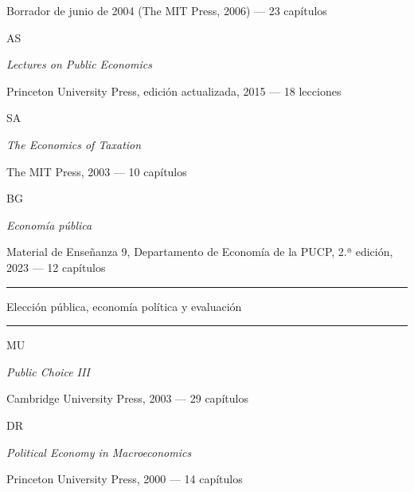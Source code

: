 \documentclass[11pt,a4paper]{article}
\newcommand{\etiqueta}[2]{%
  {\setlength{\fboxsep}{1.4pt}\colorbox{#1}{\sffamily\bfseries\color{white}\strut#2}}}
\begin{document}
\begin{titlepage}
{\small\color{tonoPizarra} Borrador de junio de 2004 (The MIT Press, 2006) --- 23 capítulos\par}
\vspace{0.15cm}
{\large\etiqueta{colorAS}{AS} \par}
{\normalsize \emph{\color{colorAS}Lectures on Public Economics}\par}
{\small\color{tonoPizarra} Princeton University Press, edición actualizada, 2015 --- 18 lecciones\par}
\vspace{0.15cm}
{\large\etiqueta{colorSA}{SA} \par}
{\normalsize \emph{\color{colorSA}The Economics of Taxation}\par}
{\small\color{tonoPizarra} The MIT Press, 2003 --- 10 capítulos\par}
\vspace{0.15cm}
{\large\etiqueta{colorBG}{BG} \par}
{\normalsize \emph{\color{colorBG}Economía pública}\par}
{\small\color{tonoPizarra} Material de Enseñanza 9, Departamento de Economía de la PUCP, 2.ª edición, 2023 --- 12 capítulos\par}
\vspace{0.4cm}
{\sffamily\large\bfseries\color{tonoPrincipal}\textcolor{tonoClaro}{\rule[0.5ex]{1.5cm}{0.6pt}}\quad Elección pública, economía política y evaluación\quad\textcolor{tonoClaro}{\rule[0.5ex]{1.5cm}{0.6pt}}\par}
\vspace{0.25cm}
{\large\etiqueta{colorMU}{MU} \par}
{\normalsize \emph{\color{colorMU}Public Choice III}\par}
{\small\color{tonoPizarra} Cambridge University Press, 2003 --- 29 capítulos\par}
\vspace{0.15cm}
{\large\etiqueta{colorDR}{DR} \par}
{\normalsize \emph{\color{colorDR}Political Economy in Macroeconomics}\par}
{\small\color{tonoPizarra} Princeton University Press, 2000 --- 14 capítulos\par}
\vspace{0.15cm}

\end{titlepage}
\end{document}
